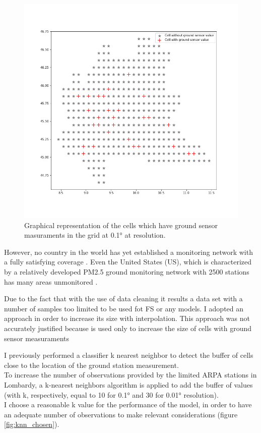 \begin{figure}[H] 
\centering
\includegraphics[scale=0.4]{images/cell_with_sensors.png}
  \caption{Graphical representation of the cells which have ground sensor masuraments in the grid at 0.1° at resolution.}
 \label{fig:knn-interpolated}
\end{figure}
However, no country in the world has yet established a monitoring network with a fully satisfying coverage \cite{liu2018improve}. Even the United States (US), which is characterized by a relatively developed PM2.5 ground monitoring network with 2500 stations has many areas unmonitored \cite{liu2018improve}. \par
Due to the fact that with the use of data cleaning it results a data set with a number of samples too limited to be used fot FS or any models.  
I adopted an approach in order to increase its size with interpolation.
This approach was not accurately justified because is used only to increase the size of cells with ground sensor measuraments

I previously performed a classifier k nearest neighbor  \cite{taunk2019brief} to detect the buffer of cells close to the location of the ground station measurement.\\
To increase the number of observations provided by the limited ARPA stations in Lombardy, a k-nearest neighbors algorithm is applied to add the buffer of values (with k, respectively, equal to 10 for 0.1° and 30 for 0.01° resolution). \\ 
I choose a reasonable k value for the performance of the model, in order to have an adequate number of observations to make relevant considerations (figure \ref{fig:knn_chosen}).

